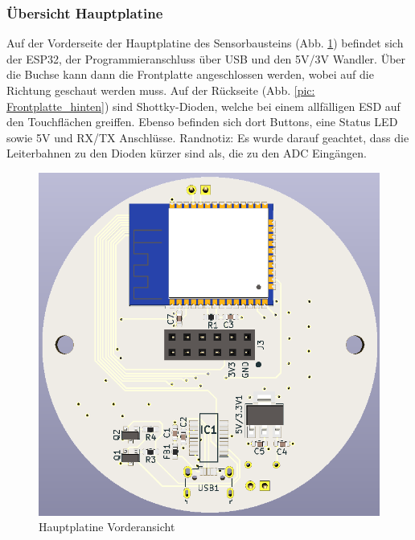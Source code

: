 \subsubsection{Übersicht Hauptplatine}
Auf der Vorderseite der Hauptplatine des Sensorbausteins (Abb. \ref{pic: Hauptplatine_vorne}) befindet sich der ESP32, der Programmieranschluss über USB und den 5V/3V Wandler. Über die Buchse kann dann die Frontplatte angeschlossen werden, wobei auf die Richtung geschaut werden muss. Auf der Rückseite (Abb. \ref{pic: Frontplatte_hinten}) sind Shottky-Dioden, welche bei einem allfälligen ESD auf den Touchflächen greiffen. Ebenso befinden sich dort Buttons, eine Status LED sowie 5V und RX/TX Anschlüsse. Randnotiz: Es wurde darauf geachtet, dass die Leiterbahnen zu den Dioden kürzer sind als, die zu den ADC Eingängen.

\begin{figure}[h!]
	\centering
	\begin{minipage}[t]{0.4\linewidth}
		\centering
		\includegraphics[width=1\textwidth]{graphics/Hauptplatine_vorne.png}
		\caption{Hauptplatine Vorderansicht}
		\label{pic: Hauptplatine_vorne}
	\end{minipage}%
	\hfill
	\begin{minipage}[t]{0.4\linewidth}
		\centering

\end{minipage}
\end{figure}
